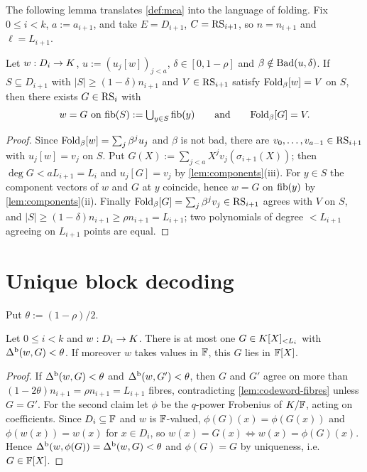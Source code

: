 The following lemma translates \cref{def:mca} into the language of folding. Fix
$0\le i<k$, $a:=a_{i+1}$, and take $E=D_{i+1}$, $C=\mathrm{RS}_{i+1}$, so $n=n_{i+1}$ and
$\ell=L_{i+1}$.

\begin{lemma}\label{lem:mca-fold}
Let $w:D_i\to K$, $u:=(u_j[w])_{j<a}$, $\delta\in[0,1-\rho]$ and $\beta\notin\mathrm{Bad}(u,\delta)$.
If $S\subseteq D_{i+1}$ with $|S|\ge(1-\delta)n_{i+1}$ and $V\in\mathrm{RS}_{i+1}$ satisfy
$\mathrm{Fold}_\beta[w]=V$ on $S$, then there exists $G\in\mathrm{RS}_i$ with
\[
w=G\ \text{on}\ \fib(S):=\textstyle\bigcup_{y\in S}\fib(y)
\qquad\text{and}\qquad \Fold_\beta[G]=V .
\]
\end{lemma}

\begin{proof}
Since $\mathrm{Fold}_\beta[w]=\sum_j\beta^ju_j$ and $\beta$ is not bad, there are
$v_0,\dots,v_{a-1}\in\mathrm{RS}_{i+1}$ with $u_j[w]=v_j$ on $S$. Put
$G(X):=\sum_{j<a}X^jv_j(\sigma_{i+1}(X))$; then $\deg G<aL_{i+1}=L_i$ and $u_j[G]=v_j$ by
\cref{lem:components}(iii). For $y\in S$ the component vectors of $w$ and $G$ at $y$
coincide, hence $w=G$ on $\mathrm{fib}(y)$ by \cref{lem:components}(ii). Finally
$\mathrm{Fold}_\beta[G]=\sum_j\beta^jv_j\in\mathrm{RS}_{i+1}$ agrees with $V$ on $S$, and
$|S|\ge(1-\delta)n_{i+1}\ge\rho n_{i+1}=L_{i+1}$; two polynomials of degree $<L_{i+1}$
agreeing on $L_{i+1}$ points are equal.
\end{proof}

\section{Unique block decoding}

Put $\theta:=(1-\rho)/2$.

\begin{lemma}\label{lem:unique-block}
Let $0\le i<k$ and $w:D_i\to K$. There is at most one $G\in K[X]_{<L_i}$ with
$\Delta^{\mathrm{b}}(w,G)<\theta$. If moreover $w$ takes values in $\mathbb{F}$, this $G$ lies in $\mathbb{F}[X]$.
\end{lemma}

\begin{proof}
If $\Delta^{\mathrm{b}}(w,G)<\theta$ and $\Delta^{\mathrm{b}}(w,G')<\theta$, then $G$ and $G'$ agree on more than
$(1-2\theta)n_{i+1}=\rho n_{i+1}=L_{i+1}$ fibres, contradicting
\cref{lem:codeword-fibres} unless $G=G'$.
For the second claim let $\phi$ be the $q$-power Frobenius of $K/\mathbb{F}$, acting on
coefficients. Since $D_i\subseteq\mathbb{F}$ and $w$ is $\mathbb{F}$-valued,
$\phi(G)(x)=\phi(G(x))$ and $\phi(w(x))=w(x)$ for $x\in D_i$, so
$w(x)=G(x)\iff w(x)=\phi(G)(x)$. Hence $\Delta^{\mathrm{b}}(w,\phi(G))=\Delta^{\mathrm{b}}(w,G)<\theta$ and
$\phi(G)=G$ by uniqueness, i.e.\ $G\in\mathbb{F}[X]$.
\end{proof}

